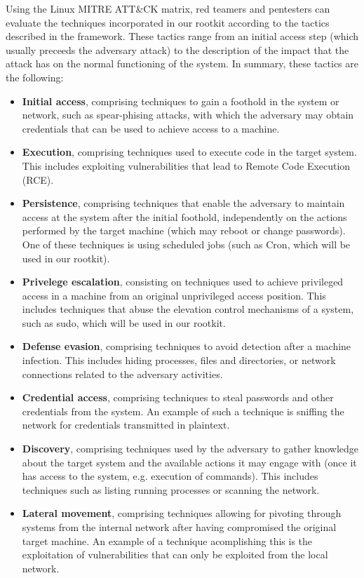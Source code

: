 Using the Linux MITRE ATT\&CK matrix, red teamers and pentesters can evaluate the techniques incorporated in our rootkit according to the tactics described in the framework. These tactics range from an initial access step (which usually preceeds the adversary attack) to the description of the impact that the attack has on the normal functioning of the system. In summary, these tactics are the following:
\begin{itemize}
\item \textbf{Initial access}, comprising techniques to gain a foothold in the system or network, such as spear-phising attacks, with which the adversary may obtain credentials that can be used to achieve access to a machine.
\item \textbf{Execution}, comprising techniques used to execute code in the target system. This includes exploiting vulnerabilities that lead to Remote Code Execution (RCE).
\item \textbf{Persistence}, comprising techniques that enable the adversary to maintain access at the system after the initial foothold, independently on the actions performed by the target machine (which may reboot or change passwords). One of these techniques is using scheduled jobs (such as Cron, which will be used in our rootkit).
\item \textbf{Privelege escalation}, consisting on techniques used to achieve privileged access in a machine from an original unprivileged access position. This includes techniques that abuse the elevation control mechanisms of a system, such as sudo, which will be used in our rootkit.
\item \textbf{Defense evasion}, comprising techniques to avoid detection after a machine infection. This includes hiding processes, files and directories, or network connections related to the adversary activities.
\item \textbf{Credential access}, comprising techniques to steal passwords and other credentials from the system. An example of such a technique is sniffing the network for credentials transmitted in plaintext.
\item \textbf{Discovery}, comprising techniques used by the adversary to gather knowledge about the target system and the available actions it may engage with (once it has access to the system, e.g. execution of commands). This includes techniques such as listing running processes or scanning the network.
\item \textbf{Lateral movement}, comprising techniques allowing for pivoting through systems from the internal network after having compromised the original target machine. An example of a technique acomplishing this is the exploitation of vulnerabilities that can only be exploited from the local network.

\end{itemize}
